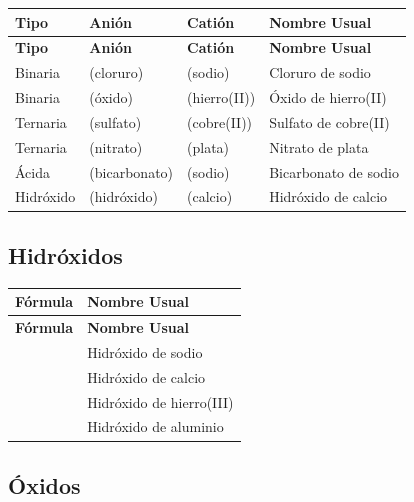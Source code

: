 \begin{longtable}{C{2.0cm} L{2.6cm} L{2.6cm} L{4.4cm}}
\toprule
\textbf{Tipo} & \textbf{Anión} & \textbf{Catión} & \textbf{Nombre Usual} \\
\midrule\endfirsthead\toprule
\textbf{Tipo} & \textbf{Anión} & \textbf{Catión} & \textbf{Nombre Usual} \\
\midrule\endhead\bottomrule\endlastfoot
Binaria     &  (cloruro)       &  (sodio)          & Cloruro de sodio \\
Binaria     &  (óxido)      &  (hierro(II)) & Óxido de hierro(II) \\
Ternaria    &  (sulfato)  &  (cobre(II))  & Sulfato de cobre(II) \\
Ternaria    &  (nitrato)      &  (plata)          & Nitrato de plata \\
Ácida       &  (bicarbonato) &  (sodio)          & Bicarbonato de sodio \\
Hidróxido   &  (hidróxido)     &  (calcio)     & Hidróxido de calcio \\
\bottomrule
\end{longtable}

\subsection*{\textcolor{blueunam}{Hidróxidos}}

\begin{longtable}{C{2.8cm} L{4.2cm}}
\toprule
\textbf{Fórmula} & \textbf{Nombre Usual} \\
\midrule\endfirsthead\toprule
\textbf{Fórmula} & \textbf{Nombre Usual} \\
\midrule\endhead\bottomrule\endlastfoot
{}          & Hidróxido de sodio \\
  & Hidróxido de calcio \\
  & Hidróxido de hierro(III) \\
  & Hidróxido de aluminio \\
\bottomrule
\end{longtable}

\subsection*{\textcolor{blueunam}{Óxidos}}


